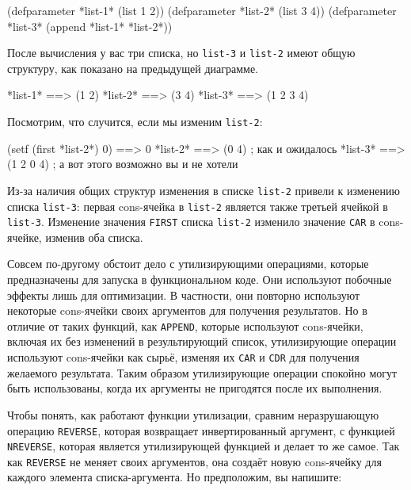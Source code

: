 \begin{myverb}
(defparameter *list-1* (list 1 2))
(defparameter *list-2* (list 3 4))
(defparameter *list-3* (append *list-1* *list-2*))
\end{myverb}

После вычисления у вас три списка, но \lstinline{list-3} и \lstinline{list-2} имеют общую
структуру, как показано на предыдущей диаграмме.

\begin{myverb}
*list-1*                  ==> (1 2)
*list-2*                  ==> (3 4)
*list-3*                  ==> (1 2 3 4)
\end{myverb}

Посмотрим, что случится, если мы изменим \lstinline{list-2}:

\begin{myverb}
(setf (first *list-2*) 0) ==> 0
*list-2*                  ==> (0 4)     ; как и ожидалось
*list-3*                  ==> (1 2 0 4) ; а вот этого возможно вы и не хотели
\end{myverb}

Из-за наличия общих структур изменения в списке \lstinline{list-2} привели к изменению списка
\lstinline{list-3}: первая cons-ячейка в \lstinline{list-2} является также третьей ячейкой в
\lstinline{list-3}. Изменение значения \lstinline{FIRST} списка \lstinline{list-2} изменило значение
\lstinline{CAR} в cons-ячейке, изменив оба списка.

Совсем по-другому обстоит дело с утилизирующими операциями, которые предназначены для
запуска в функциональном коде. Они используют побочные эффекты лишь для оптимизации. В
частности, они повторно используют некоторые cons-ячейки своих аргументов для получения
результатов. Но в отличие от таких функций, как \lstinline{APPEND}, которые используют
cons-ячейки, включая их без изменений в результирующий список, утилизирующие операции
используют cons-ячейки как сырьё, изменяя их \lstinline{CAR} и \lstinline{CDR} для получения
желаемого результата. Таким образом утилизирующие операции спокойно могут быть
использованы, когда их аргументы не пригодятся после их выполнения.

Чтобы понять, как работают функции утилизации, сравним неразрушающую операцию
\lstinline{REVERSE}, которая возвращает инвертированный аргумент, с функцией \lstinline{NREVERSE},
которая является утилизирующей функцией и делает то же самое. Так как \lstinline{REVERSE} не
меняет своих аргументов, она создаёт новую cons-ячейку для каждого элемента
списка-аргумента. Но предположим, вы напишите:

